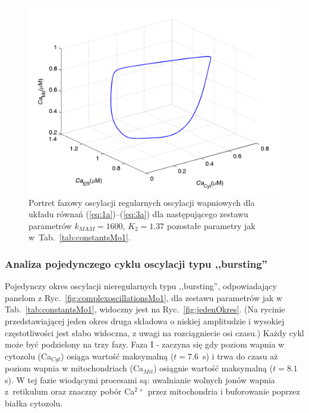 \begin{figure}[ht]
	\centering
	\includegraphics[width=1\textwidth]{rysunki/rozdzial_5/regular_cycleMo1}
	\caption[Portret fazowy w Modelu \#1 - oscylacje regularne]{Portret fazowy oscylacji regularnych oscylacji wapniowych dla układu równań (\ref{eq:1a})--(\ref{eq:3a}) dla następującego zestawu parametrów $k_{MAM} = 1600$, $K_{2} = 1.37$ pozostałe parametry jak w~Tab.~\ref{tab:constantsMo1}.}
	\label{fig:phaseportraitregularMo1}
\end{figure}

\FloatBarrier
\subsubsection*{Analiza pojedynczego cyklu oscylacji typu ,,bursting''}

Pojedynczy okres oscylacji nieregularnych typu ,,bursting'', odpowiadający panelom z Ryc.~\ref{fig:complexoscillationsMo1}, dla zestawu parametrów jak w Tab.~\ref{tab:constantsMo1}, widoczny jest na Ryc.~\ref{fig:jedenOkres}. (Na rycinie przedstawiającej jeden okres druga składowa o niskiej amplitudzie i wysokiej częstotliwości jest słabo widoczna, z uwagi na rozciągniecie osi czasu.) Każdy cykl może być podzielony na trzy fazy. Faza I - zaczyna się gdy poziom wapnia w cytozolu (Ca$_{Cyt}$) osiąga wartość maksymalną ($t = 7.6$~s) i trwa do czasu aż poziom wapnia w mitochondriach (Ca$_{Mit}$) osiągnie wartość maksymalną ($t = 8.1$ s). W tej fazie wiodącymi procesami są: uwalnianie wolnych jonów wapnia z~retikulum oraz znaczny pobór Ca$^{2+}$ przez mitochondria i buforowanie poprzez białka cytozolu. 

